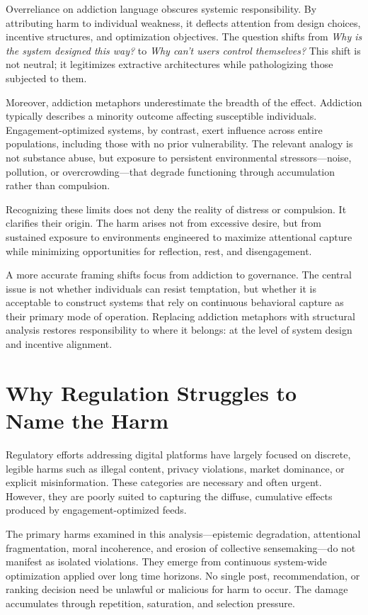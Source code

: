 \documentclass[12pt]{article}
\begin{document}
Overreliance on addiction language obscures systemic responsibility. By attributing harm to individual weakness, it deflects attention from design choices, incentive structures, and optimization objectives. The question shifts from \emph{Why is the system designed this way?} to \emph{Why can’t users control themselves?} This shift is not neutral; it legitimizes extractive architectures while pathologizing those subjected to them.

Moreover, addiction metaphors underestimate the breadth of the effect. Addiction typically describes a minority outcome affecting susceptible individuals. Engagement-optimized systems, by contrast, exert influence across entire populations, including those with no prior vulnerability. The relevant analogy is not substance abuse, but exposure to persistent environmental stressors—noise, pollution, or overcrowding—that degrade functioning through accumulation rather than compulsion.

Recognizing these limits does not deny the reality of distress or compulsion. It clarifies their origin. The harm arises not from excessive desire, but from sustained exposure to environments engineered to maximize attentional capture while minimizing opportunities for reflection, rest, and disengagement.

A more accurate framing shifts focus from addiction to governance. The central issue is not whether individuals can resist temptation, but whether it is acceptable to construct systems that rely on continuous behavioral capture as their primary mode of operation. Replacing addiction metaphors with structural analysis restores responsibility to where it belongs: at the level of system design and incentive alignment.

\section{Why Regulation Struggles to Name the Harm}

Regulatory efforts addressing digital platforms have largely focused on discrete, legible harms such as illegal content, privacy violations, market dominance, or explicit misinformation. These categories are necessary and often urgent. However, they are poorly suited to capturing the diffuse, cumulative effects produced by engagement-optimized feeds.

The primary harms examined in this analysis—epistemic degradation, attentional fragmentation, moral incoherence, and erosion of collective sensemaking—do not manifest as isolated violations. They emerge from continuous system-wide optimization applied over long time horizons. No single post, recommendation, or ranking decision need be unlawful or malicious for harm to occur. The damage accumulates through repetition, saturation, and selection pressure.
\end{document}
